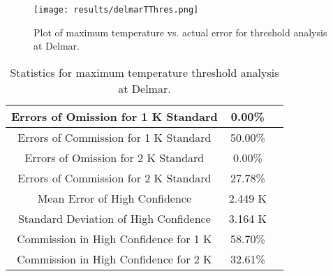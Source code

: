 \documentclass{book}
\begin{document}
\begin{minipage}[c]{0.47\textwidth}
\centering
\begin{figure}[H]
\texttt{[image: results/delmarTThres.png]}
\caption{Plot of maximum temperature vs. actual error for threshold analysis at Delmar.}
\label{fig:delmarTThres}
\end{figure}
\end{minipage}
\begin{minipage}[c]{0.47\textwidth}
\begin{table}[H]
\centering
\footnotesize
\begin{tabular}{ | c | c | c | } \hline
Errors of Omission for 1 K Standard & 0.00\% \\ \hline
Errors of Commission for 1 K Standard & 50.00\% \\ \hline
Errors of Omission for 2 K Standard & 0.00\% \\ \hline
Errors of Commission for 2 K Standard & 27.78\% \\ \hline
Mean Error of High Confidence & 2.449 K \\ \hline
Standard Deviation of High Confidence & 3.164 K \\ \hline
Commission in High Confidence for 1 K & 58.70\% \\ \hline
Commission in High Confidence for 2 K & 32.61\% \\ \hline
\end{tabular}
\caption{Statistics for maximum temperature threshold analysis at Delmar.}
\label{tab:delmarTThres}
\end{table}
\end{minipage}
\end{document}

